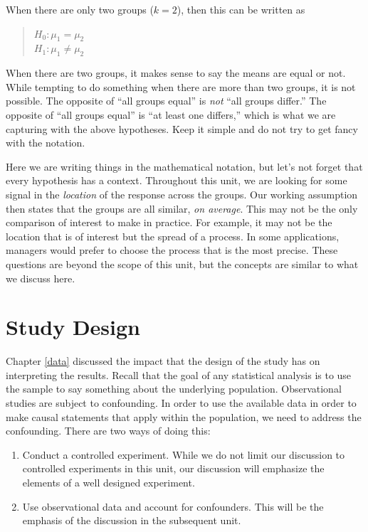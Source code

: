 \documentclass[]{book}
\providecommand{\tightlist}{%
  \setlength{\itemsep}{0pt}\setlength{\parskip}{0pt}}
\theoremstyle{definition}
\theoremstyle{definition}
\theoremstyle{remark}
\let\BeginKnitrBlock\begin \let\EndKnitrBlock\end
\begin{document}
When there are only two groups (\(k = 2\)), then this can be written as

\begin{quote}
\(H_0: \mu_1 = \mu_2\)\\
\(H_1: \mu_1 \neq \mu_2\)
\end{quote}

\BeginKnitrBlock{rmdtip}
When there are two groups, it makes sense to say the means are equal or
not. While tempting to do something when there are more than two groups,
it is not possible. The opposite of ``all groups equal'' is \emph{not}
``all groups differ.'' The opposite of ``all groups equal'' is ``at
least one differs,'' which is what we are capturing with the above
hypotheses. Keep it simple and do not try to get fancy with the
notation.
\EndKnitrBlock{rmdtip}

Here we are writing things in the mathematical notation, but let's not
forget that every hypothesis has a context. Throughout this unit, we are
looking for some signal in the \emph{location} of the response across
the groups. Our working assumption then states that the groups are all
similar, \emph{on average}. This may not be the only comparison of
interest to make in practice. For example, it may not be the location
that is of interest but the spread of a process. In some applications,
managers would prefer to choose the process that is the most precise.
These questions are beyond the scope of this unit, but the concepts are
similar to what we discuss here.

\chapter{Study Design}\label{ANOVAdata}

Chapter \ref{data} discussed the impact that the design of the study has
on interpreting the results. Recall that the goal of any statistical
analysis is to use the sample to say something about the underlying
population. Observational studies are subject to confounding. In order
to use the available data in order to make causal statements that apply
within the population, we need to address the confounding. There are two
ways of doing this:

\begin{enumerate}
\def\labelenumi{\arabic{enumi}.}
\tightlist
\item
  Conduct a controlled experiment. While we do not limit our discussion
  to controlled experiments in this unit, our discussion will emphasize
  the elements of a well designed experiment.
\item
  Use observational data and account for confounders. This will be the
  emphasis of the discussion in the subsequent unit.
\end{enumerate}
\end{document}
